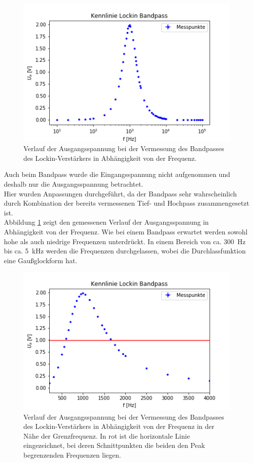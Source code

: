 \documentclass[12pt,a4paper]{article}
\begin{document}
\begin{figure}
\centering
\includegraphics[scale=1]{Bilder/Vorversuch2/KennlinieBandpass.png}
\caption[test]{Verlauf der Ausgangsspannung bei der Vermessung des Bandpasses des Lockin-Verstärkers in Abhängigkeit von der Frequenz.}
\label{fig:LockinBandpass_Verlauf}
\end{figure}

Auch beim Bandpass wurde die Eingangsspannung nicht aufgenommen und deshalb nur die Ausgangsspannung betrachtet. \\
Hier wurden Anpassungen durchgeführt, da der Bandpass sehr wahrscheinlich durch Kombination der bereits vermessenen Tief- und Hochpass zusammengesetzt ist. \\
Abbildung \ref{fig:LockinBandpass_Verlauf} zeigt den gemessenen Verlauf der Ausgangsspannung in Abhängigkeit von der Frequenz. Wie bei einem Bandpass erwartet werden sowohl hohe als auch niedrige Frequenzen unterdrückt. In einem Bereich von ca. \SI{300}{Hz} bis ca. \SI{5}{kHz} werden die Frequenzen durchgelassen, wobei die Durchlassfunktion eine Gaußglockform hat.

\begin{figure}
\centering
\includegraphics[scale=1]{Bilder/Vorversuch2/AblesenBandpass.png}
\caption[test]{Verlauf der Ausgangsspannung bei der Vermessung des Bandpasses des Lockin-Verstärkers in Abhängigkeit von der Frequenz in der Nähe der Grenzfrequenz. In rot ist die horizontale Linie eingezeichnet, bei deren Schnittpunkten die beiden den Peak begrenzenden Frequenzen liegen.}
\label{fig:LockinBandpass_Ablesen}
\end{figure}
\end{document}
